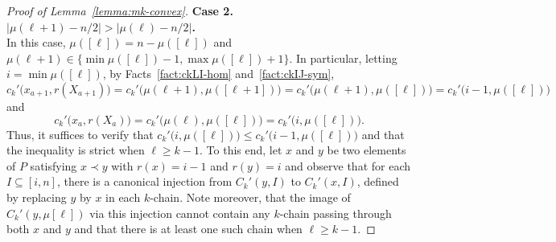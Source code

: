 \documentclass[11pt,a4paper,reqno]{amsart}
\numberwithin{claim}{thm}
\theoremstyle{definition}
\renewcommand{\le}{\leqslant}
\renewcommand{\ge}{\geqslant}
\begin{document}
\begin{proof}[{Proof of Lemma~\ref{lemma:mk-convex}}]
  \noindent
  \textbf{Case 2. $|\mu(\ell+1) - n/2| > |\mu(\ell) - n/2|$.} \\
  In this case, $\mu([\ell]) = n - \mu([\ell])$ and $\mu(\ell+1) \in \{\min\mu([\ell]) - 1, \max\mu([\ell])+1\}$. In particular, letting $i = \min\mu([\ell])$, by Facts~\ref{fact:ckLI-hom} and~\ref{fact:ckIJ-sym},
  \[
    c_k'\big(x_{a+1}, r(X_{a+1})\big) = c_k'\big(\mu(\ell+1), \mu([\ell+1])\big) = c_k'\big(\mu(\ell+1), \mu([\ell])\big) = c_k'\big(i-1, \mu([\ell])\big)
  \]
  and
  \[
    c_k'\big(x_a, r(X_a)\big) = c_k'\big(\mu(\ell), \mu([\ell])\big) = c_k'\big(i, \mu([\ell])\big).
  \]
  Thus, it suffices to verify that $c_k'\big(i, \mu([\ell])\big) \le c_k'\big(i-1, \mu([\ell])\big)$ and that the inequality is strict when $\ell \ge k-1$. To this end, let $x$ and $y$ be two elements of $P$ satisfying $x \prec y$ with $r(x) = i-1$ and $r(y) = i$ and observe that for each $I \subseteq [i,n]$, there is a canonical injection from $C_k'(y, I)$ to $C_k'(x, I)$, defined by replacing $y$ by $x$ in each $k$-chain. Note moreover, that the image of $C_k'(y, \mu[\ell])$ via this injection cannot contain any $k$-chain passing through both $x$ and $y$ and that there is at least one such chain when $\ell \ge k-1$.
\end{proof}
\end{document}

